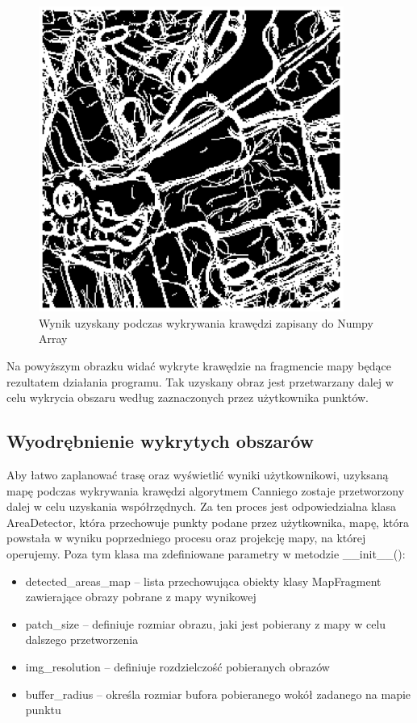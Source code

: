 \begin{figure}[H]
    \centering
    \includegraphics[width=10cm]{images/Canny.jpg}
    \caption{Wynik uzyskany podczas wykrywania krawędzi zapisany do Numpy Array}
\end{figure}

Na powyższym obrazku widać wykryte krawędzie na fragmencie mapy będące rezultatem działania programu. Tak uzyskany obraz jest przetwarzany dalej w celu wykrycia obszaru według zaznaczonych przez użytkownika punktów.

\subsection{Wyodrębnienie wykrytych obszarów}

Aby łatwo zaplanować trasę oraz wyświetlić wyniki użytkownikowi, uzyksaną mapę podczas wykrywania krawędzi algorytmem Canniego zostaje przetworzony dalej w celu uzyskania współrzędnych. Za ten proces jest odpowiedzialna klasa AreaDetector, która przechowuje punkty podane przez użytkownika, mapę, która powstała w wyniku poprzedniego procesu oraz projekcję mapy, na której operujemy. Poza tym klasa ma zdefiniowane parametry w metodzie \_\_init\_\_():

\begin{itemize}
    \item detected\_areas\_map -- lista przechowująca obiekty klasy MapFragment zawierające obrazy pobrane z mapy wynikowej
    \item patch\_size -- definiuje rozmiar obrazu, jaki jest pobierany z mapy w celu dalszego przetworzenia
    \item img\_resolution -- definiuje rozdzielczość pobieranych obrazów
    \item buffer\_radius -- określa rozmiar bufora pobieranego wokół zadanego na mapie punktu
\end{itemize}

